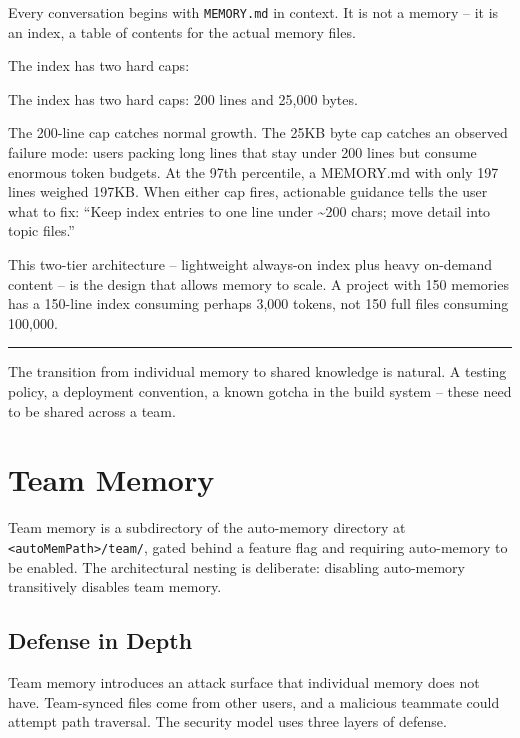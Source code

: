 \documentclass[
  english,
  11pt,
  letterpaper,
]{book}
\begin{document}
Every conversation begins with \texttt{MEMORY.md} in context. It is not
a memory -- it is an index, a table of contents for the actual memory
files.

The index has two hard caps:

The index has two hard caps: 200 lines and 25,000 bytes.

The 200-line cap catches normal growth. The 25KB byte cap catches an
observed failure mode: users packing long lines that stay under 200
lines but consume enormous token budgets. At the 97th percentile, a
MEMORY.md with only 197 lines weighed 197KB. When either cap fires,
actionable guidance tells the user what to fix: ``Keep index entries to
one line under \textasciitilde200 chars; move detail into topic files.''

This two-tier architecture -- lightweight always-on index plus heavy
on-demand content -- is the design that allows memory to scale. A
project with 150 memories has a 150-line index consuming perhaps 3,000
tokens, not 150 full files consuming 100,000.

\begin{center}\rule{0.5\linewidth}{0.5pt}\end{center}

The transition from individual memory to shared knowledge is natural. A
testing policy, a deployment convention, a known gotcha in the build
system -- these need to be shared across a team.

\section{Team Memory}\label{team-memory}

Team memory is a subdirectory of the auto-memory directory at
\texttt{\textless{}autoMemPath\textgreater{}/team/}, gated behind a
feature flag and requiring auto-memory to be enabled. The architectural
nesting is deliberate: disabling auto-memory transitively disables team
memory.

\subsection{Defense in Depth}\label{defense-in-depth}

Team memory introduces an attack surface that individual memory does not
have. Team-synced files come from other users, and a malicious teammate
could attempt path traversal. The security model uses three layers of
defense.
\end{document}
